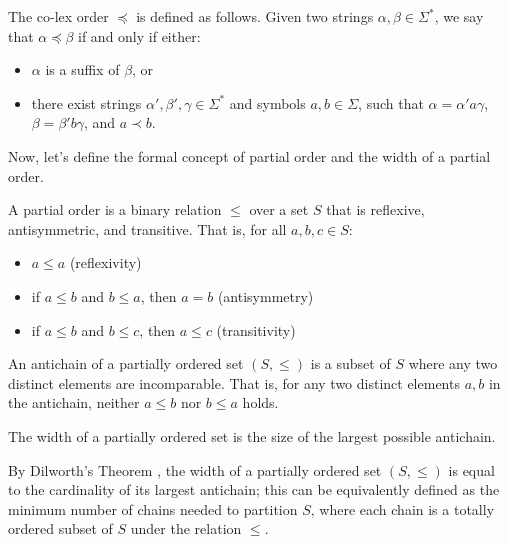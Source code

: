 \begin{definition} 
    The co-lex order $\preceq$ is defined as follows. Given two strings $\alpha, \beta \in \Sigma^*$, we say that $\alpha \preceq \beta$ if and only if either:
    \begin{itemize}[leftmargin=25pt]
        \item $\alpha$ is a suffix of $\beta$, or
        \item there exist strings $\alpha', \beta', \gamma \in \Sigma^*$ and symbols $a, b \in \Sigma$, such that $\alpha = \alpha'a\gamma$, $\beta = \beta'b\gamma$, and $a \prec b$.
    \end{itemize}
\end{definition}

Now, let's define the formal concept of partial order and the width of a partial order. 
\begin{definition}
    A partial order is a binary relation $\leq$ over a set $S$ that is reflexive, antisymmetric, and transitive. That is, for all $a, b, c \in S$:
    \begin{itemize}[leftmargin=25pt]
        \item $a \leq a$ (reflexivity)
        \item if $a \leq b$ and $b \leq a$, then $a = b$ (antisymmetry)
        \item if $a \leq b$ and $b \leq c$, then $a \leq c$ (transitivity)
    \end{itemize}
\end{definition}

\begin{definition}[Antichain]
    An antichain of a partially ordered set $(S, \leq)$ is a subset of $S$ where any two distinct elements are incomparable. That is, for any two distinct elements $a, b$ in the antichain, neither $a \leq b$ nor $b \leq a$ holds.
\end{definition}

\begin{definition}
    The width of a partially ordered set is the size of the largest possible antichain.
\end{definition}

By Dilworth's Theorem \cite{dilworth1990decomposition}, the width of a partially ordered set $(S, \leq)$ is equal to the cardinality of its largest antichain; this can be equivalently defined as the minimum number of chains needed to partition $S$, where each chain is a totally ordered subset of $S$ under the relation $\leq$. 

